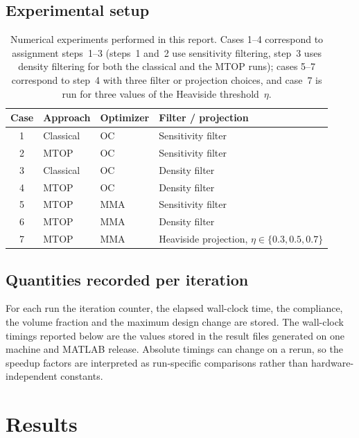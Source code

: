 \documentclass[11pt,a4paper]{article}
\begin{document}
\subsection{Experimental setup}\label{sec:experiment-matrix}

\begin{table}[htbp]
  \centering
  \caption{Numerical experiments performed in this report. Cases 1--4 correspond to assignment steps~1--3 (steps~1 and~2 use sensitivity filtering, step~3 uses density filtering for both the classical and the MTOP runs); cases 5--7 correspond to step~4 with three filter or projection choices, and case~7 is run for three values of the Heaviside threshold~$\eta$.}
  \label{tab:experiments}
  \begin{tabular}{clll}
    \toprule
    Case & Approach & Optimizer & Filter / projection \\
    \midrule
    1 & Classical & OC & Sensitivity filter \\
    2 & MTOP & OC & Sensitivity filter \\
    3 & Classical & OC & Density filter \\
    4 & MTOP & OC & Density filter \\
    5 & MTOP & MMA & Sensitivity filter \\
    6 & MTOP & MMA & Density filter \\
    7 & MTOP & MMA & Heaviside projection, $\eta\in\{0.3,0.5,0.7\}$ \\
    \bottomrule
  \end{tabular}
\end{table}

\subsection{Quantities recorded per iteration}

For each run the iteration counter, the elapsed wall-clock time, the compliance, the volume fraction and the maximum design change are stored. The wall-clock timings reported below are the values stored in the result files generated on one machine and MATLAB release. Absolute timings can change on a rerun, so the speedup factors are interpreted as run-specific comparisons rather than hardware-independent constants.

\section{Results}
\end{document}

